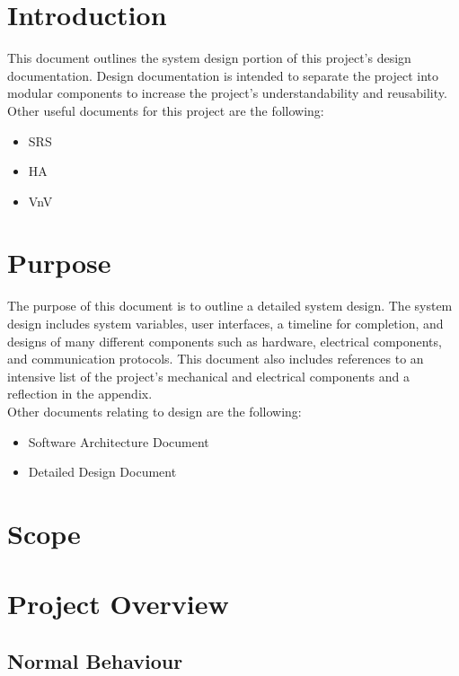 \documentclass[12pt, titlepage]{article}
\begin{document}
\section{Introduction}
This document outlines the system design portion of this project's design documentation. Design documentation 
is intended to separate the project into modular components to increase the project's understandability and reusability. \\
Other useful documents for this project are the following:
\begin{itemize}
  \item SRS
  \item HA
  \item VnV
\end{itemize}

\section{Purpose}
The purpose of this document is to outline a detailed system design. The system design includes system variables, user interfaces, a timeline for completion, and designs of many 
different components such as hardware, electrical components, and communication protocols. This document also includes references to an intensive list of the project's
mechanical and electrical components and a reflection in the appendix. \\
Other documents relating to design are the following:
\begin{itemize}
  \item Software Architecture Document
  \item Detailed Design Document
\end{itemize}
\section{Scope}


\section{Project Overview}

\subsection{Normal Behaviour}
\end{document}
